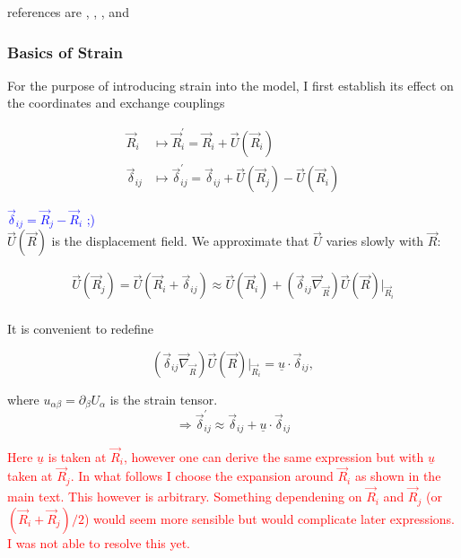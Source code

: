 \documentclass[../../../main.tex]{subfiles}
\begin{document}
references are \cite{Nayga2019}, \cite{Kitt2012}, \cite{Ramezani_Masir2013}, \cite{Castro_Neto2009} and \cite{Sun2023}

\subsubsection{Basics of Strain}

For the purpose of introducing strain into the model, I first establish its effect on the coordinates and exchange couplings 

\begin{align}
	\vec{R}_i &\mapsto \vec{R}_i^\prime = \vec{R}_i + \vec{U}(\vec{R}_i) \\
	\vec{\delta}_{ij} &\mapsto \vec{\delta}_{ij}^\prime = \vec{\delta}_{ij} + \vec{U}(\vec{R}_j) - \vec{U}(\vec{R}_i)
\end{align}

\textcolor{blue}{$\vec{\delta}_{ij} = \vec{R}_j-\vec{R}_i$ ;)} \\

$\vec{U}(\vec{R})$ is the displacement field. We approximate that $\vec{U}$ varies slowly with $\vec{R}$:

\begin{gather}
	\vec{U}(\vec{R}_j) = \vec{U}(\vec{R}_i + \vec{\delta}_{ij}) \approx \vec{U}(\vec{R}_i) + \left(\vec{\delta}_{ij}\vec{\nabla}_{\vec{R}}\right) \vec{U}(\vec{R}) \big\rvert_{\vec{R}_i} \\
\end{gather}


It is convenient to redefine 

\begin{equation}
	\left( \vec{\delta}_{ij} \vec{\nabla}_{\vec{R}} \right) \vec{U}(\vec{R})\big\rvert_{\vec{R}_i} = \underline{u} \cdot \vec{\delta}_{ij},
\end{equation}

where $u_{\alpha\beta} = \partial_{\beta}U_{\alpha}$ is the strain tensor. \\

\begin{equation}
	\Rightarrow \vec{\delta}_{ij}^\prime \approx \vec{\delta}_{ij} + \underline{u}\cdot\vec{\delta}_{ij} 
\end{equation}

\textcolor{red}{Here $\underline{u}$ is taken at $\vec{R}_i$, however one can derive the same expression but with $\underline{u}$ taken at $\vec{R}_j$. In what follows I choose the expansion around $\vec{R}_i$ as shown in the main text. This however is arbitrary. Something dependening on $\vec{R}_i$ and $\vec{R}_j$ (or $(\vec{R}_i + \vec{R}_j)/2$) would seem more sensible but would complicate later expressions. I was not able to resolve this yet.} \\
\end{document}
